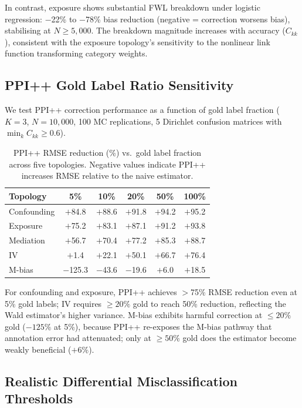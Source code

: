 In contrast, exposure shows substantial FWL breakdown under logistic regression: $-$22\% to $-$78\% bias reduction (negative = correction worsens bias), stabilising at $N \geq 5{,}000$. The breakdown magnitude increases with accuracy ($C_{kk}$), consistent with the exposure topology's sensitivity to the nonlinear link function transforming category weights.

\subsection{PPI++ Gold Label Ratio Sensitivity}
\label{sec:ppi_gold_ratio}

We test PPI++ correction performance as a function of gold label fraction ($K{=}3$, $N{=}10{,}000$, 100 MC replications, 5 Dirichlet confusion matrices with $\min_k C_{kk}{\geq}0.6$).

\begin{table}[h]
\centering
\small
\caption{PPI++ RMSE reduction (\%) vs.\ gold label fraction across five topologies. Negative values indicate PPI++ increases RMSE relative to the naive estimator.}
\label{tab:ppi_gold_ratio}
\begin{tabular}{lccccc}
\toprule
Topology & 5\% & 10\% & 20\% & 50\% & 100\% \\
\midrule
Confounding & $+$84.8 & $+$88.6 & $+$91.8 & $+$94.2 & $+$95.2 \\
Exposure & $+$75.2 & $+$83.1 & $+$87.1 & $+$91.2 & $+$93.8 \\
Mediation & $+$56.7 & $+$70.4 & $+$77.2 & $+$85.3 & $+$88.7 \\
IV & $+$1.4 & $+$22.1 & $+$50.1 & $+$66.7 & $+$76.4 \\
M-bias & $-$125.3 & $-$43.6 & $-$19.6 & $+$6.0 & $+$18.5 \\
\bottomrule
\end{tabular}
\end{table}

For confounding and exposure, PPI++ achieves $>$75\% RMSE reduction even at 5\% gold labels; IV requires ${\geq}20\%$ gold to reach 50\% reduction, reflecting the Wald estimator's higher variance. M-bias exhibits harmful correction at ${\leq}20\%$ gold ($-125\%$ at 5\%), because PPI++ re-exposes the M-bias pathway that annotation error had attenuated; only at ${\geq}50\%$ gold does the estimator become weakly beneficial ($+6\%$).

\subsection{Realistic Differential Misclassification Thresholds}
\label{sec:realistic_epsilon}

